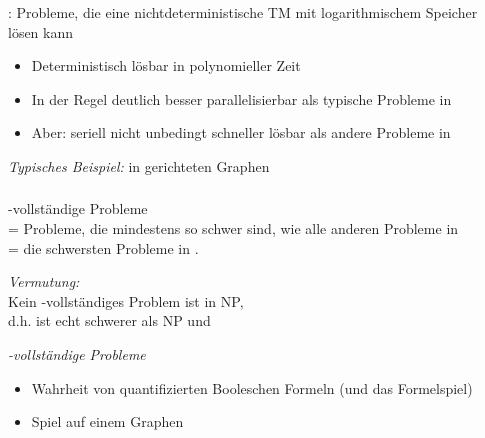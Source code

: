 \documentclass[aspectratio=1610,onlymath]{beamer}
\begin{document}
\maketitle

\begin{frame}\frametitle{}

\NLogSpace: Probleme, die eine nichtdeterministische TM mit logarithmischem Speicher lösen kann


\begin{itemize}
\item Deterministisch lösbar in polynomieller Zeit
\item In der Regel deutlich besser parallelisierbar als typische Probleme in \PTime
\item Aber: seriell nicht unbedingt schneller lösbar als andere Probleme in \PTime
\end{itemize}
\bigskip

\emph{Typisches Beispiel:}
 in gerichteten Graphen


\end{frame}

\begin{frame}\frametitle{\PSpace}

\PSpace-vollständige Probleme\\ = Probleme, die mindestens so schwer
sind, wie alle anderen Probleme in \PSpace\\
= die schwersten Probleme in \PSpace.
\bigskip

\emph{Vermutung:}\\
Kein \PSpace-vollständiges Problem ist in NP,\\ d.h. \PSpace
ist echt schwerer als NP und 
\bigskip

\emph{\PSpace-vollständige Probleme}
\begin{itemize}
\item {} Wahrheit von quantifizierten Booleschen Formeln (und das Formelspiel)
\item {} Spiel auf einem Graphen
\end{itemize}


\end{frame}

\end{document}
